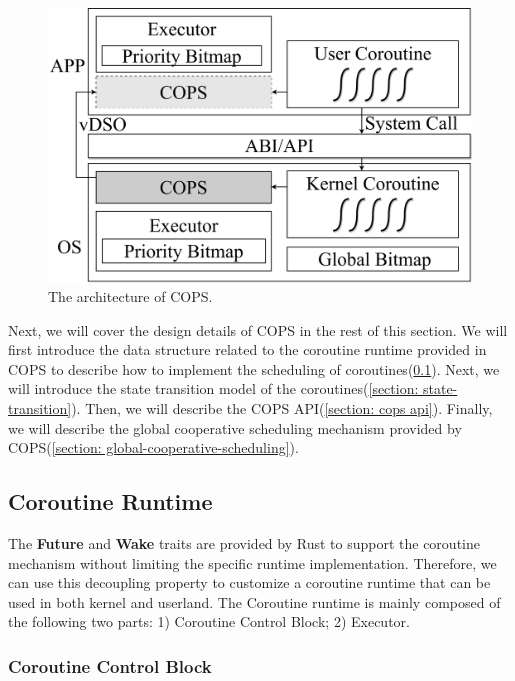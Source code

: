 \documentclass[sigconf,review,anonymous]{acmart}
\begin{document}
\begin{figure}[h]
  \centering
  \includegraphics[width=\linewidth]{assets/arch.pdf}
  \caption{The architecture of COPS.}
  \label{fig:arch}
\end{figure}

Next, we will cover the design details of COPS in the rest of this section. We will first introduce the data structure related to the coroutine runtime provided in COPS to describe how to implement the scheduling of coroutines(\ref{section: Coroutine Runtime}). Next, we will introduce the state transition model of the coroutines(\ref{section: state-transition}). Then, we will describe the COPS API(\ref{section: cops api}). Finally, we will describe the global cooperative scheduling mechanism provided by COPS(\ref{section: global-cooperative-scheduling}).

\subsection{Coroutine Runtime}
\label{section: Coroutine Runtime}

The \textbf{Future} and \textbf{Wake} traits are provided by Rust to support the coroutine mechanism without limiting the specific runtime implementation. Therefore, we can use this decoupling property to customize a coroutine runtime that can be used in both kernel and userland. The Coroutine runtime is mainly composed of the following two parts: 1) Coroutine Control Block; 2) Executor.

\subsubsection{Coroutine Control Block}
\end{document}
